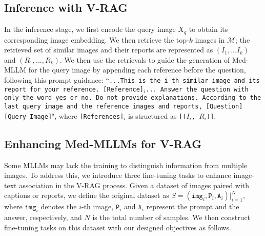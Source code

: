 \subsection{Inference with V-RAG}

In the inference stage, we first encode the query image $X_{q}$ to obtain its corresponding image embedding. We then retrieve the top-$k$ images in $\mathcal{M}$; the retrieved set of similar images and their reports are represented as $(I_{1}, ... I_{k})$ and $(R_{1}, ..., R_{k})$.
We then use the retrievals to guide the generation of Med-MLLM for the query image by appending each reference before the question, following this prompt guidance:
``\texttt{...This is the i-th similar image and its report for your reference. [Reference]$_i$... Answer the question with only the word yes or no. Do not provide explanations. According to the last query image and the reference images and reports, [Question] [Query Image]}", where \texttt{[References]$_i$} is structured as \texttt{[($I_i$, $R_i$)]}.




\subsection{Enhancing Med-MLLMs for V-RAG}
Some MLLMs may lack the training to distinguish information from multiple images.
To address this, we introduce three fine-tuning tasks to enhance image-text association in the V-RAG process.
Given a dataset of images paired with captions or reports, we define the original dataset as $S = {(\texttt{img}_{i}, \texttt{P}_i, \texttt{A}_i)}|^{N}_{i=1}$, where $\texttt{img}_{i}$ denotes the $i$-th image, $\texttt{P}_i$ and $\texttt{A}_i$ represent the prompt and the answer, respectively, and $N$ is the total number of samples.
We then construct fine-tuning tasks on this dataset with our designed objectives as follows.


